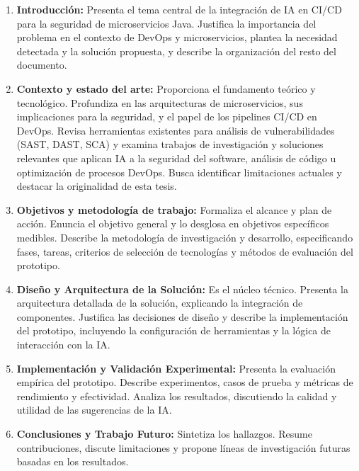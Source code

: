 \begin{enumerate}
\item \textbf{Introducción:} Presenta el tema central de la integración de IA en CI/CD para la seguridad de microservicios Java. Justifica la importancia del problema en el contexto de DevOps y microservicios, plantea la necesidad detectada y la solución propuesta, y describe la organización del resto del documento.

\item \textbf{Contexto y estado del arte:} Proporciona el fundamento teórico y tecnológico. Profundiza en las arquitecturas de microservicios, sus implicaciones para la seguridad, y el papel de los pipelines CI/CD en DevOps. Revisa herramientas existentes para análisis de vulnerabilidades (SAST, DAST, SCA) y examina trabajos de investigación y soluciones relevantes que aplican IA a la seguridad del software, análisis de código u optimización de procesos DevOps. Busca identificar limitaciones actuales y destacar la originalidad de esta tesis.

\item \textbf{Objetivos y metodología de trabajo:} Formaliza el alcance y plan de acción. Enuncia el objetivo general y lo desglosa en objetivos específicos medibles. Describe la metodología de investigación y desarrollo, especificando fases, tareas, criterios de selección de tecnologías y métodos de evaluación del prototipo.

\item \textbf{Diseño y Arquitectura de la Solución:} Es el núcleo técnico. Presenta la arquitectura detallada de la solución, explicando la integración de componentes. Justifica las decisiones de diseño y describe la implementación del prototipo, incluyendo la configuración de herramientas y la lógica de interacción con la IA.

\item \textbf{Implementación y Validación Experimental:} Presenta la evaluación empírica del prototipo. Describe experimentos, casos de prueba y métricas de rendimiento y efectividad. Analiza los resultados, discutiendo la calidad y utilidad de las sugerencias de la IA.

\item \textbf{Conclusiones y Trabajo Futuro:} Sintetiza los hallazgos. Resume contribuciones, discute limitaciones y propone líneas de investigación futuras basadas en los resultados.
\end{enumerate}

